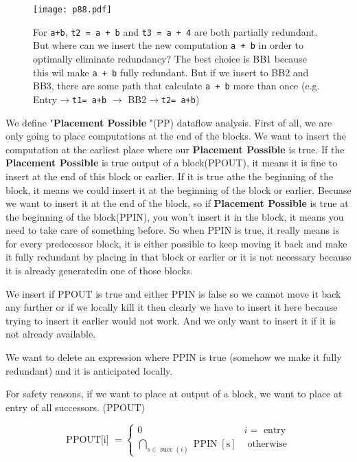 \begin{figure}[H]
    \centering
     \texttt{[image: p88.pdf]}
         \caption{For \texttt{a+b}, \texttt{t2 = a + b} and \texttt{t3 = a + 4} are both partially redundant. But where can we insert the new computation \texttt{a + b} in order to optimally eliminate redundancy?
         The best choice is BB1 because this wil  make \texttt{a + b} fully redundant. But if we insert to BB2 and BB3, there are some path that calculate \texttt{a + b} more than once (e.g. Entry$\rightarrow$\texttt{t1= a+b} $\rightarrow$ BB2$\rightarrow$\texttt{t2= a+b}) }
         \label{fig:p88}
\end{figure}

We define "\textbf{Placement Possible }"(PP) dataflow analysis. First of all, we are only going to place computations at the end of the blocks. 
We want to insert the computation at the earliest place where our \textbf{Placement Possible }is true. If the \textbf{Placement Possible }is true output of a block(PPOUT), it means 
it is fine to insert at the end of this block or earlier. If it is true athe the beginning of the block, it means we could insert it at the beginning of the block or earlier. Becuase we want to
insert it at the end of the block, so if \textbf{Placement Possible }is true at the beginning of the block(PPIN), you won't insert it in the block, it means you need to take care of something before.
So when PPIN is true, it really means is for every predecessor block, it is either possible to keep moving it back and make it fully redundant by placing in that block or earlier or it is not necessary because 
it is already generatedin one of those blocks. 

We insert if PPOUT is true and either PPIN is false so we cannot move it back any further or if we locally kill it then clearly we have to insert it here because trying to insert it earlier would not work. And we only want to insert it if it is not 
already available.


We want to delete an expression where PPIN is true (somehow we make it fully redundant) and it is anticipated locally.


For safety reasons, if we want to place at output of a block, we want to place at entry of all successors. (PPOUT)

$$
\text { PPOUT[i] }=\left\{\begin{array}{cl}
0 & i=\text { entry } \\
\bigcap_{s \in \operatorname{succ}(i)} \operatorname{PPIN}[\mathrm{s}] & \text { otherwise }
\end{array}\right.
$$


